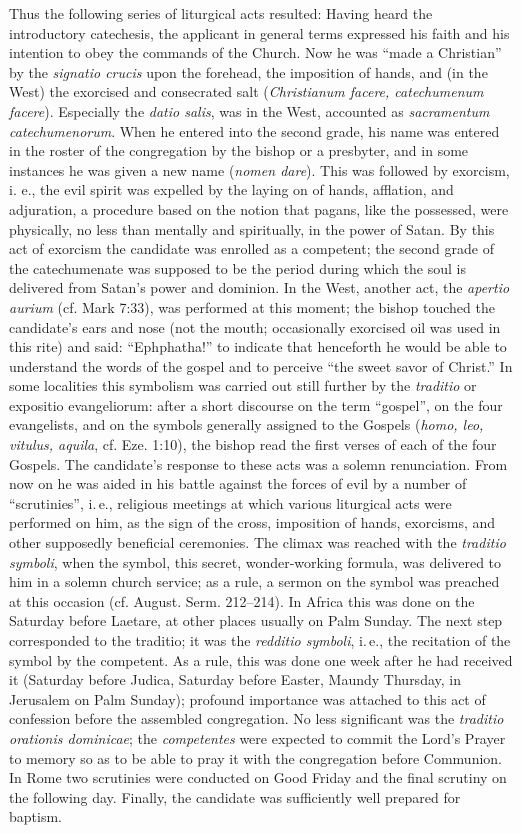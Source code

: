 Thus the following series of liturgical acts resulted: Having heard the introductory catechesis, the applicant in general terms expressed his faith and his intention to obey the commands of the Church. Now he was “made a Christian” by the \emph{signatio crucis} upon the forehead, the imposition of hands, and (in the West) the exorcised and consecrated salt (\emph{Christianum facere, catechumenum facere}). Especially the \emph{datio salis}, was in the West, accounted as \emph{sacramentum catechumenorum}. When he entered into the second grade, his name was entered in the roster of the congregation by the bishop or a presbyter, and in some instances he was given a new name (\emph{nomen dare}). This was followed by exorcism, i. e., the evil spirit was expelled by the laying on of hands, afflation, and adjuration, a procedure based on the notion that pagans, like the possessed, were physically, no less than mentally and spiritually, in the power of Satan. By this act of exorcism the candidate was enrolled as a competent; the second grade of the catechumenate was supposed to be the period during which the soul is delivered from Satan’s power and dominion. In the West, another act, the \emph{apertio aurium} (cf. Mark 7:33), was performed at this moment; the bishop touched the candidate’s ears and nose (not the mouth; occasionally exorcised oil was used in this rite) and said: “Ephphatha!” to indicate that henceforth he would be able to understand the words of the gospel and to perceive “the sweet savor of Christ.” In some localities this symbolism was carried out still further by the \emph{traditio}
or expositio evangeliorum: after a short discourse on the term “gospel”, on the four evangelists, and on the symbols generally assigned to the Gospels (\emph{homo, leo, vitulus, aquila}, cf. Eze. 1:10), the bishop read the first verses of each of the four Gospels. The candidate’s response to these acts was a solemn renunciation. From now on he was aided in his battle against the forces of evil by a number of “scrutinies”, i.\,e., religious meetings at which various liturgical acts were performed on him, as the sign of the cross, imposition of hands, exorcisms, and other supposedly beneficial ceremonies. The climax was reached with the \emph{traditio symboli}, when the symbol, this secret, wonder-working formula, was delivered to him in a solemn church service; as a rule, a sermon on the symbol was preached at this occasion (cf. August. Serm. 212–214). In Africa this was done on the Saturday before Laetare, at other places usually on Palm Sunday. The next step corresponded to the traditio; it was the \emph{redditio symboli}, i.\,e., the recitation of the symbol by the competent. As a rule, this was done one week after he had received it (Saturday before Judica, Saturday before Easter, Maundy Thursday, in Jerusalem on Palm Sunday); profound importance was attached to this act of confession before the assembled congregation. No less significant was the \emph{traditio orationis dominicae}; the \emph{competentes} were expected to commit the Lord’s Prayer to memory so as to be able to pray it with the congregation before Communion. In Rome two scrutinies were conducted on Good Friday and the final scrutiny on the following day. Finally, the candidate was sufficiently well prepared for baptism.


